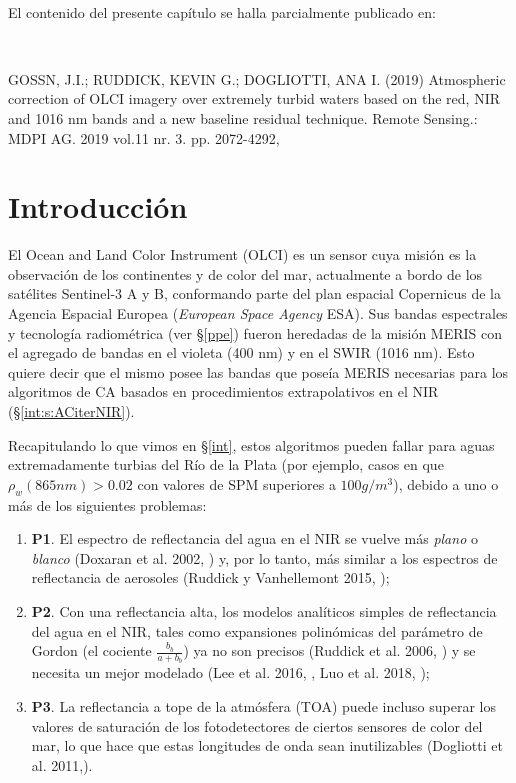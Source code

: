 $\quad$
\noindent

El contenido del presente capítulo se halla parcialmente publicado en:

$\quad$
\noindent

GOSSN, J.I.; RUDDICK, KEVIN G.; DOGLIOTTI, ANA I. (2019) Atmospheric correction of OLCI imagery over extremely turbid waters based on the red, NIR and 1016 nm bands and a new baseline residual technique. Remote Sensing.: MDPI AG. 2019 vol.11 nr. 3. pp. 2072-4292, \cite{gossn2019}

\section{Introducción}
\label{blr:s:introduction}

    El Ocean and Land Color Instrument (OLCI) es un sensor cuya misión es la observación de los continentes y de color del mar, actualmente a bordo de los satélites Sentinel-3 A y B, conformando parte del plan espacial Copernicus de la Agencia Espacial Europea (\textit{European Space Agency} ESA). Sus bandas espectrales y tecnología radiométrica (ver \S \ref{ppe}) fueron heredadas de la misión MERIS con el agregado de bandas en el violeta (400 nm) y en el SWIR (1016 nm). Esto quiere decir que el mismo posee las bandas que poseía MERIS necesarias para los algoritmos de CA basados en procedimientos extrapolativos en el NIR (\S \ref{int:s:ACiterNIR}).
    
    Recapitulando lo que vimos en \S \ref{int}, estos algoritmos pueden fallar para aguas extremadamente turbias del Río de la Plata (por ejemplo, casos en que $\rho_{w}(865 nm)>0.02 $ con valores de SPM superiores a $100g/m^{3}$), debido a uno o más de los siguientes problemas:
    
    \begin{enumerate}

        \item[] \textbf{P1}. El espectro de reflectancia del agua en el NIR se vuelve más \textit{plano} o \textit{blanco} (Doxaran et al. 2002, \cite{doxaran2002}) y, por lo tanto, más similar a los espectros de reflectancia de aerosoles (Ruddick y Vanhellemont 2015, \cite{ruddick2015});
    
        \item[] \textbf{P2}. Con una reflectancia alta, los modelos analíticos simples de reflectancia del agua en el NIR, tales como expansiones polinómicas del parámetro de Gordon (el cociente $\frac{b_{b}}{a + b_{b}}$) ya no son precisos (Ruddick et al. 2006, \cite{ruddick2006}) y se necesita un mejor modelado (Lee et al. 2016, \cite {lee2016}, Luo et al. 2018, \cite {luo2018});
    
        \item[] \textbf{P3}. La reflectancia a tope de la atmósfera (TOA) puede incluso superar los valores de saturación de los fotodetectores de ciertos sensores de color del mar, lo que hace que estas longitudes de onda sean inutilizables (Dogliotti et al. 2011,\cite {dogliotti2011}).
    
    \end{enumerate}
    
